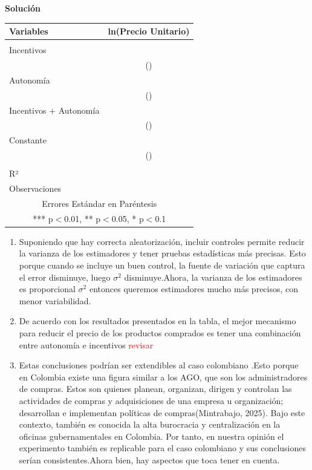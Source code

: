 \documentclass[a4paper, answers, addpoints, 11pt]{exam}
\newenvironment{solucion}{%
  \begin{mdframed}[
    backgroundcolor=blue!5,    %
    linecolor=blue!50,          %
    linewidth=2pt,              %
    leftmargin=10pt,            %
    rightmargin=10pt,           %
    topline=true,              %
    bottomline=true,            %
    roundcorner=10pt,           %
    innerleftmargin=10pt,       %
    innerrightmargin=10pt,      %
    innerbottommargin=10pt,     %
    innertopmargin=10pt         %
  ]%
  \begin{tcolorbox}[colframe=blue!50!black, colback=blue!50, coltitle=white, sharp corners=all, boxrule=1mm, width=\textwidth, halign=left, valign=center, top=0mm, bottom=0mm, left=0mm, right=0mm] \textbf{Solución} \end{tcolorbox} }{\end{mdframed}}
\begin{document}
\begin{enumerate}
\begin{solucion}
\begin{table}[H]
\begin{tabular}{lc}
Variables & ln(Precio Unitario) \\ \hline
 &  \\
Incentivos &  \\
 & () \\
Autonomía &  \\
 & () \\
 Incentivos + Autonomía&  \\
 & () \\
Constante &  \\
 & () \\
 &  \\
R² &  \\
Observaciones &  \\ \hline
\multicolumn{2}{c}{ Errores Estándar en Paréntesis} \\
\multicolumn{2}{c}{ *** p$<$0.01, ** p$<$0.05, * p$<$0.1} \\
\end{tabular}
    \end{table}
     \begin{enumerate}
     \item Suponiendo que hay correcta aleatorización, incluir controles permite reducir la varianza de los estimadores y tener pruebas estadísticas más precisas. Esto porque cuando se incluye un buen control, la fuente de variación que captura el error disminuye, luego $\sigma^2$ disminuye.Ahora, la varianza de los estimadores es proporcional  $\sigma^2$ entonces queremos estimadores mucho más precisos, con menor variabilidad.
     
     \item De acuerdo con los resultados presentados en la tabla, el mejor mecanismo para reducir el precio de los productos comprados es tener una combinación entre autonomía e incentivos \textcolor{red}{revisar}
     
      \item Estas conclusiones podrían ser extendibles al caso colombiano .Esto porque en Colombia existe una figura similar a los AGO, que son los administradores de compras. Estos son quienes planean, organizan, dirigen y controlan las actividades de compras y adquisiciones de una empresa u organización; desarrollan e implementan políticas de compras(Mintrabajo, 2025). Bajo este contexto, también es conocida la alta burocracia y centralización en la oficinas gubernamentales en Colombia. 
    Por tanto, en nuestra opinión el experimento también es replicable para el caso colombiano y sus conclusiones serían consistentes.Ahora bien, hay aspectos que toca tener en cuenta.
    \end{enumerate}
   \end{solucion}


\end{enumerate}
\end{document}
